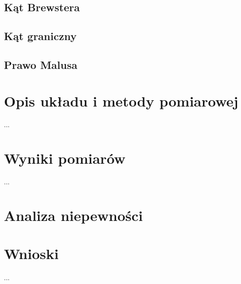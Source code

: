 \documentclass[a4paper,10pt]{article}
\begin{document}
\subsection{Kąt Brewstera}

\subsection{Kąt graniczny}

\subsection{Prawo Malusa}






\section{Opis układu i metody pomiarowej}

\paragraph{}...

\section{Wyniki pomiarów}...

\section{Analiza niepewności}

\section{Wnioski}
\paragraph{}...
\end{document}
